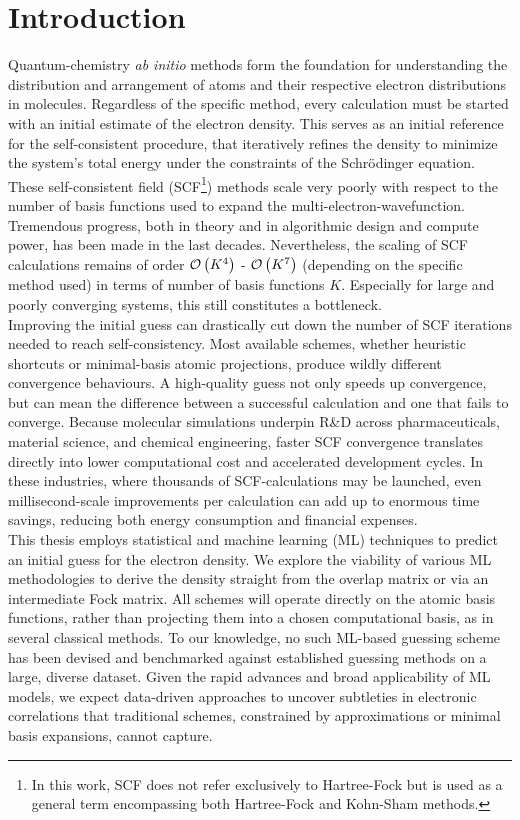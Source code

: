 \chapter{Introduction}
\label{sec:introduction}

Quantum-chemistry \textit{ab initio} methods form the foundation for understanding the distribution and arrangement of atoms and their respective electron distributions in molecules. Regardless of the specific method, every calculation must be started with an initial estimate of the electron density. This serves as an initial reference for the self-consistent procedure, that iteratively refines the density to minimize the system's total energy under the constraints of the Schrödinger equation. These self-consistent field (SCF\footnote{In this work, SCF does not refer exclusively to Hartree-Fock but is used as a general term encompassing both Hartree-Fock and Kohn-Sham methods.}) methods scale very poorly with respect to the number of basis functions used to expand the multi-electron-wavefunction. Tremendous progress, both in theory and in algorithmic design and compute power, has been made in the last decades. Nevertheless, the scaling of SCF calculations remains of order $\mathcal{O}\left(K^4\right)$ - $\mathcal{O}\left(K^7\right)$ (depending on the specific method used) in terms of number of basis functions $K$. Especially for large and poorly converging systems, this still constitutes a bottleneck. \\

Improving the initial guess can drastically cut down the number of SCF iterations needed to reach self-consistency. Most available schemes, whether heuristic shortcuts or minimal-basis atomic projections, produce wildly different convergence behaviours. A high-quality guess not only speeds up convergence, but can mean the difference between a successful calculation and one that fails to converge. Because molecular simulations underpin R\&D across pharmaceuticals, material science, and chemical engineering, faster SCF convergence translates directly into lower computational cost and accelerated development cycles. In these industries, where thousands of SCF-calculations may be launched, even millisecond-scale improvements per calculation can add up to enormous time savings, reducing both energy consumption and financial expenses. \\
This thesis employs statistical and machine learning (ML) techniques to predict an initial guess for the electron density. We explore the viability of various ML methodologies to derive the density straight from the overlap matrix or via an intermediate Fock matrix. All schemes will operate directly on the atomic basis functions, rather than projecting them into a chosen computational basis, as in several classical methods. To our knowledge, no such ML-based guessing scheme has been devised and benchmarked against established guessing methods on a large, diverse dataset. Given the rapid advances and broad applicability of ML models, we expect data-driven approaches to uncover subtleties in electronic correlations that traditional schemes, constrained by approximations or minimal basis expansions, cannot capture.\\

